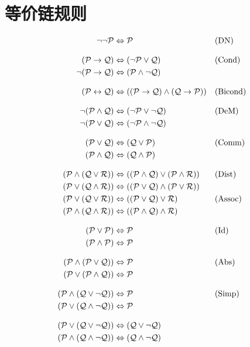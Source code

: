 \section{等价链规则}

\ifHTMLtarget
\begin{align*}
\lnot\lnot \mathcal{P} & \Leftrightarrow \mathcal{P} && \text{(DN)}\\[2ex]
(\mathcal{P} \rightarrow \mathcal{Q}) & \Leftrightarrow (\lnot \mathcal{P} \lor \mathcal{Q})
&& \text{(Cond)}\\
\lnot(\mathcal{P} \rightarrow \mathcal{Q}) & \Leftrightarrow (\mathcal{P} \land \lnot\mathcal{Q}) \\[2ex]
(\mathcal{P} \leftrightarrow \mathcal{Q}) & \Leftrightarrow ((\mathcal{P} \rightarrow \mathcal{Q}) \land  (\mathcal{Q} \rightarrow \mathcal{P}))
&& \text{(Bicond)}\\[2ex]
\lnot(\mathcal{P} \land \mathcal{Q}) & \Leftrightarrow (\lnot\mathcal{P} \lor \lnot\mathcal{Q})
&& \text{(DeM)}\\
\lnot(\mathcal{P} \lor \mathcal{Q}) & \Leftrightarrow (\lnot\mathcal{P} \land \lnot\mathcal{Q}) \\[2ex]
(\mathcal{P} \lor \mathcal{Q}) & \Leftrightarrow (\mathcal{Q} \lor \mathcal{P}) & &\text{(Comm)}\\
(\mathcal{P} \land \mathcal{Q}) & \Leftrightarrow (\mathcal{Q} \land \mathcal{P})\\[2ex]
(\mathcal{P} \land (\mathcal{Q} \lor \mathcal{R})) & \Leftrightarrow ((\mathcal{P} \land \mathcal{Q}) \lor (\mathcal{P} \land \mathcal{R}))
&& \text{(Dist)}\\
(\mathcal{P} \lor (\mathcal{Q} \land \mathcal{R})) & \Leftrightarrow ((\mathcal{P} \lor \mathcal{Q}) \land (\mathcal{P} \lor \mathcal{R}))\\
(\mathcal{P} \lor (\mathcal{Q} \lor \mathcal{R})) & \Leftrightarrow ((\mathcal{P} \lor \mathcal{Q}) \lor \mathcal{R}) & &\text{(Assoc)}\\
(\mathcal{P} \land (\mathcal{Q} \land \mathcal{R})) & \Leftrightarrow ((\mathcal{P} \land \mathcal{Q}) \land \mathcal{R})\\[2ex]
(\mathcal{P} \lor \mathcal{P}) & \Leftrightarrow \mathcal{P} && \text{(Id)}\\
(\mathcal{P} \land \mathcal{P}) & \Leftrightarrow \mathcal{P}\\[2ex]
(\mathcal{P} \land (\mathcal{P} \lor \mathcal{Q})) & \Leftrightarrow \mathcal{P}&& \text{(Abs)}\\
(\mathcal{P} \lor (\mathcal{P} \land \mathcal{Q})) & \Leftrightarrow \mathcal{P}\\[2ex]
(\mathcal{P} \land (\mathcal{Q} \lor \lnot\mathcal{Q})) & \Leftrightarrow \mathcal{P}  && \text{(Simp)}\\
(\mathcal{P} \lor (\mathcal{Q} \land \lnot\mathcal{Q})) & \Leftrightarrow \mathcal{P}\\[2ex]
(\mathcal{P} \lor (\mathcal{Q} \lor \lnot\mathcal{Q})) & \Leftrightarrow (\mathcal{Q} \lor \lnot\mathcal{Q}) \\
(\mathcal{P} \land (\mathcal{Q} \land \lnot\mathcal{Q})) & \Leftrightarrow (\mathcal{Q} \land \lnot\mathcal{Q})
\end{align*}
\else

